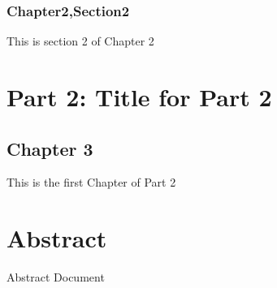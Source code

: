 \documentclass[letterpaper,10pt,english]{sphinxmanual}
\begin{document}
\subsection{Chapter2,Section2}
\label{\detokenize{chapter2:chapter2-section2}}
This is section 2 of Chapter 2


\chapter{Part 2: Title for Part 2}
\label{\detokenize{part2:part-2-title-for-part-2}}\label{\detokenize{part2::doc}}

\section{Chapter 3}
\label{\detokenize{chapter3:chapter-3}}\label{\detokenize{chapter3::doc}}
This is the first Chapter of Part 2


\chapter{Abstract}
\label{\detokenize{abstract:abstract}}\label{\detokenize{abstract::doc}}
Abstract Document







\renewcommand{\indexname}{Index}
\printindex
\end{document}
